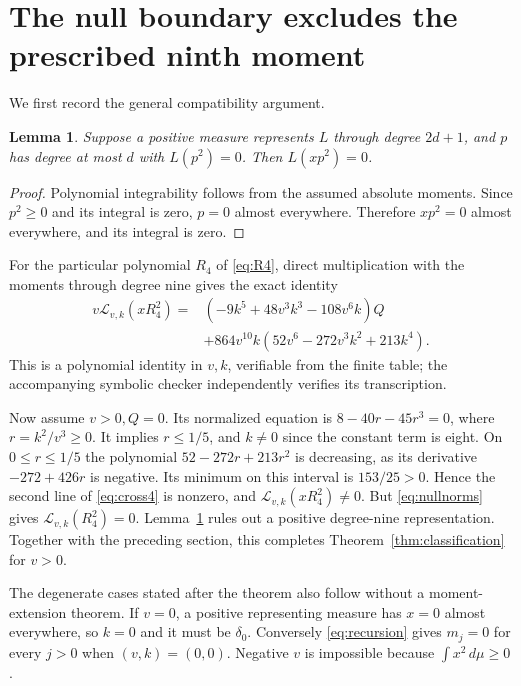 \documentclass[11pt]{article}
\newtheorem{lemma}[theorem]{Lemma}
\newcommand{\Lk}{\mathcal L_{v,k}}
\begin{document}
\section{The null boundary excludes the prescribed ninth moment}
We first record the general compatibility argument.

\begin{lemma}\label{lem:null}
Suppose a positive measure represents $L$ through degree
$2d+1$, and $p$ has degree at most $d$ with $L(p^2)=0$.
Then $L(xp^2)=0$.
\end{lemma}
\begin{proof}
Polynomial integrability follows from the assumed
absolute moments. Since $p^2\geq0$ and its integral is
zero, $p=0$ almost everywhere. Therefore $xp^2=0$
almost everywhere, and its integral is zero.
\end{proof}

For the particular polynomial $R_4$ of \eqref{eq:R4},
direct multiplication with the moments through degree
nine gives the exact identity
\begin{equation}\label{eq:cross4}
\begin{split}
 v\Lk(xR_4^2)={}&(-9k^5+48v^3k^3-108v^6k)Q\\
 &+864v^{10}k(52v^6-272v^3k^2+213k^4).
\end{split}
\end{equation}
This is a polynomial identity in $v,k$, verifiable from
the finite table; the accompanying symbolic checker
independently verifies its transcription.

Now assume $v>0,Q=0$. Its normalized equation is
$8-40r-45r^3=0$, where $r=k^2/v^3\geq0$.
It implies $r\leq1/5$, and $k\ne0$ since the constant
term is eight. On $0\leq r\leq1/5$ the polynomial
$52-272r+213r^2$ is decreasing, as its derivative
$-272+426r$ is negative. Its minimum on this interval is
$153/25>0$. Hence the second line of \eqref{eq:cross4}
is nonzero, and $\Lk(xR_4^2)\ne0$.
But \eqref{eq:nullnorms} gives $\Lk(R_4^2)=0$.
Lemma~\ref{lem:null} rules out a positive degree-nine
representation. Together with the preceding section,
this completes Theorem~\ref{thm:classification} for $v>0$.

The degenerate cases stated after the theorem also follow
without a moment-extension theorem. If $v=0$, a positive
representing measure has $x=0$ almost everywhere, so
$k=0$ and it must be $\delta_0$. Conversely
\eqref{eq:recursion} gives $m_j=0$ for every $j>0$
when $(v,k)=(0,0)$. Negative $v$ is impossible because
$\int x^2\,d\mu\geq0$.
\end{document}
